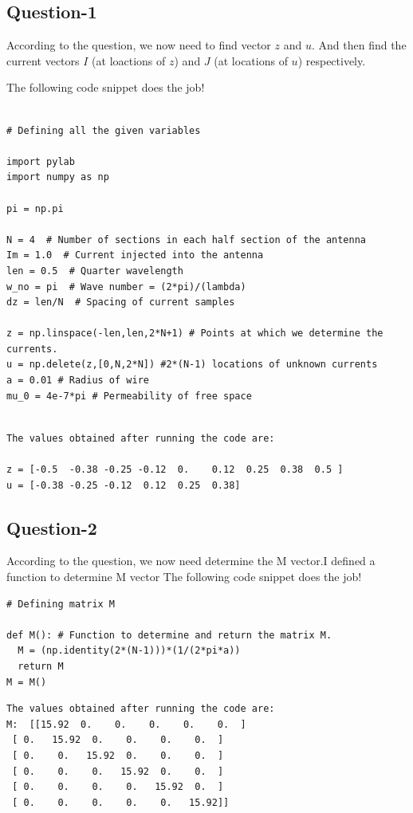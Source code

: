\documentclass{article}
\begin{document}
\subsection{Question-1}
According to the question, we now need to find vector $z$ and $u$. And then find the current vectors $I$ (at loactions of $z$) and $J$ (at locations of $u$) respectively.

\newline The following code snippet does the job!
\begin{verbatim}

# Defining all the given variables 

import pylab
import numpy as np

pi = np.pi 

N = 4  # Number of sections in each half section of the antenna
Im = 1.0  # Current injected into the antenna
len = 0.5  # Quarter wavelength
w_no = pi  # Wave number = (2*pi)/(lambda)
dz = len/N  # Spacing of current samples

z = np.linspace(-len,len,2*N+1) # Points at which we determine the currents.
u = np.delete(z,[0,N,2*N]) #2*(N-1) locations of unknown currents
a = 0.01 # Radius of wire
mu_0 = 4e-7*pi # Permeability of free space

\end{verbatim}
\begin{verbatim}

The values obtained after running the code are:

z = [-0.5  -0.38 -0.25 -0.12  0.    0.12  0.25  0.38  0.5 ]
u = [-0.38 -0.25 -0.12  0.12  0.25  0.38]

\end{verbatim}

\subsection{Question-2}
According to the question, we now need determine the M vector.I defined a function to determine M vector
\newline The following code snippet does the job!
\begin{verbatim}
# Defining matrix M

def M(): # Function to determine and return the matrix M.
  M = (np.identity(2*(N-1)))*(1/(2*pi*a))
  return M
M = M()

\end{verbatim}
\begin{verbatim}
The values obtained after running the code are:
M:  [[15.92  0.    0.    0.    0.    0.  ]
 [ 0.   15.92  0.    0.    0.    0.  ]
 [ 0.    0.   15.92  0.    0.    0.  ]
 [ 0.    0.    0.   15.92  0.    0.  ]
 [ 0.    0.    0.    0.   15.92  0.  ]
 [ 0.    0.    0.    0.    0.   15.92]]
\end{verbatim}
\end{document}
